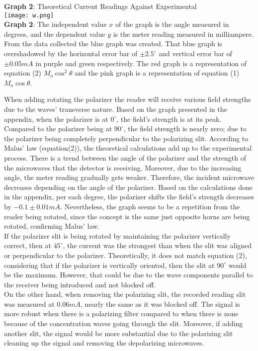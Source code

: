 \documentclass[11pt]{article}
\begin{document}
\newpage
\begin{center}
    \textbf{Graph 2}: Theoretical Current Readings Against Experimental\\
    \texttt{[image: w.png]}\\\textbf{Graph 2}: The independent value $x$ of the graph is the angle measured in degrees, and the dependent value $y$ is the meter reading measured in milliampere. From the data collected the blue graph was created. That blue graph is overshadowed by the horizontal error bar of $\pm 2.5^\circ$ and vertical error bar of $\pm 0.05 mA$ in purple and green respectively. The red graph is a representation of equation (2) $M_o\cos^2\theta$ and the pink graph is a representation of equation (1) $M_o\cos\theta$. 
\end{center}
When adding rotating the polarizer the reader will receive various field strengths due to the waves' transverse nature.  Based on the graph presented in the appendix, when the polarizer is at $0^\circ$, the field's strength is at its peak. Compared to the polarizer being at $90^\circ$, the field strength is nearly zero; due to the polarizer being completely perpendicular to the polarizing slit. According to Malus' law (equation(2)), the theoretical calculations add up to the experimental process. There is a trend between the angle of the polarizer and the strength of the microwaves that the detector is receiving. Moreover, due to the increasing angle, the meter reading gradually gets weaker. Therefore, the incident microwave decreases depending on the angle of the polarizer. Based on the calculations done in the appendix, per each degree, the polarizer shifts the field's strength decreases by $-0.1 \pm 0.01mA$. Nevertheless, the graph seems to be a repetition from the reader being rotated, since the concept is the same just opposite horns are being rotated, confirming Malus' law. \\
If the polarizer slit is being rotated by maintaining the polarizer vertically correct, then at $45^\circ$, the current was the strongest than when the slit was aligned or perpendicular to the polarizer. Theoretically, it does not match equation (2), considering that if the polarizer is vertically oriented, then the slit at $90^\circ$ would be the maximum. However, that could be due to the wave components parallel to the receiver being introduced and not blocked off.\\
On the other hand, when removing the polarizing slit, the recorded reading slit was measured at $0.06 mA$, nearly the same as it was blocked off. The signal is more robust when there is a polarizing filter compared to when there is none because of the concentration waves going through the slit. Moreover, if adding another slit, the signal would be more substantial due to the polarizing slit cleaning up the signal and removing the depolarizing microwaves.\\
\end{document}
